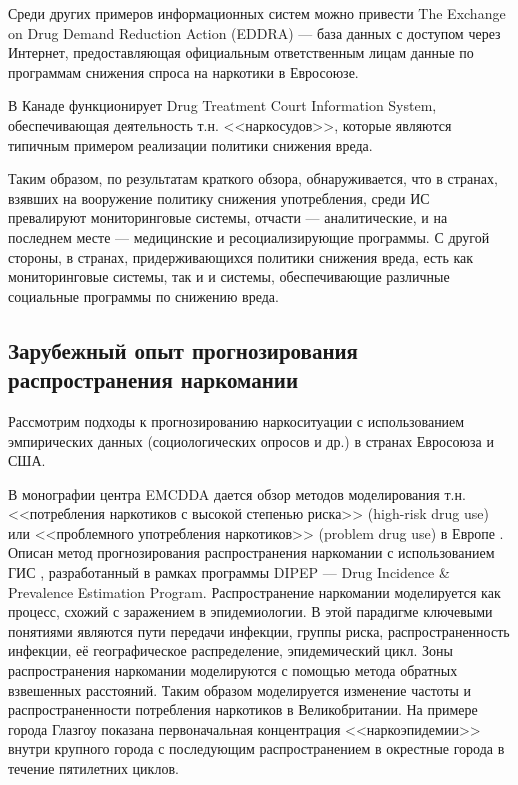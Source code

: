 \documentclass[a4paper,14pt]{article}
\begin{document}
Среди других примеров информационных систем можно привести The Exchange on Drug 
Demand Reduction Action (EDDRA) --- база данных с доступом через Интернет, 
предоставляющая официальным ответственным лицам данные по программам снижения 
спроса на наркотики в Евросоюзе.

В Канаде функционирует Drug Treatment Court Information System, обеспечивающая 
деятельность т.н. <<наркосудов>>, которые являются типичным примером реализации 
политики снижения вреда.

Таким образом, по результатам краткого обзора, обнаруживается, что в странах, 
взявших на вооружение политику снижения употребления, среди ИС превалируют 
мониторинговые системы, отчасти --- аналитические, и на последнем месте --- 
медицинские и ресоциализирующие программы.
С другой стороны, в странах, придерживающихся политики снижения вреда, есть как 
мониторинговые системы, так и и системы, обеспечивающие различные социальные 
программы по снижению вреда.

\subsection{Зарубежный опыт прогнозирования распространения наркомании}

Рассмотрим подходы к прогнозированию наркоситуации с использованием эмпирических
данных (социологических опросов и др.) в странах Евросоюза и США.

В монографии центра EMCDDA дается обзор методов моделирования т.н. <<потребления
наркотиков с высокой степенью риска>> (high-risk drug use) или <<проблемного
употребления наркотиков>> (problem drug use) в Европе \cite{EMCDDA2001}. Описан
метод прогнозирования распространения наркомании с использованием ГИС
\cite{EMCDDA2001,Wiessing1999}, разработанный в рамках программы DIPEP --- Drug
Incidence \& Prevalence Estimation Program. Распространение наркомании
моделируется как процесс, схожий с заражением в эпидемиологии. В этой парадигме
ключевыми понятиями являются пути передачи инфекции, группы риска,
распространенность инфекции, её географическое распределение, эпидемический
цикл. Зоны распространения наркомании моделируются с помощью метода обратных
взвешенных расстояний. Таким образом моделируется изменение частоты и
распространенности потребления наркотиков в Великобритании.  На примере города
Глазгоу показана первоначальная концентрация <<наркоэпидемии>> внутри крупного
города с последующим распространением в окрестные города в течение пятилетних
циклов. 
\end{document}
